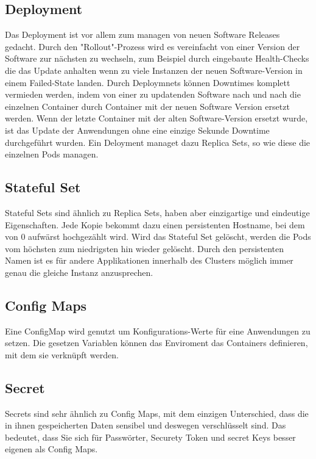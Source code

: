\subsection{Deployment}
Das Deployment ist vor allem zum managen von neuen Software Releases gedacht. 
Durch den "Rollout"-Prozess wird es vereinfacht von einer Version der Software zur nächsten zu wechseln, zum Beispiel durch eingebaute Health-Checks die das Update anhalten wenn zu viele Instanzen der neuen Software-Version in einem Failed-State landen.
Durch Deploymnets können Downtimes komplett vermieden werden, indem von einer zu updatenden Software nach und nach die einzelnen Container durch Container mit der neuen Software Version ersetzt werden.
Wenn der letzte Container mit der alten Software-Version ersetzt wurde, ist das Update der Anwendungen ohne eine einzige Sekunde Downtime durchgeführt wurden.
Ein Deloyment managet dazu Replica Sets, so wie diese die einzelnen Pods managen.
\cite[S.113 ff.]{Kubernetes_up_and_running}

\subsection{Stateful Set}
Stateful Sets sind ähnlich zu Replica Sets, haben aber einzigartige und eindeutige Eigenschaften.
Jede Kopie bekommt dazu einen persistenten Hostname, bei dem von 0 aufwärst hochgezählt wird. 
Wird das Stateful Set gelöscht, werden die Pods vom höchsten zum niedrigsten hin wieder gelöscht.
Durch den persistenten Namen ist es für andere Applikationen innerhalb des Clusters möglich immer genau die gleiche Instanz anzusprechen.
\cite[S.186 f.]{Kubernetes_up_and_running}

\subsection{Config Maps}
Eine ConfigMap wird genutzt um Konfigurations-Werte für eine Anwendungen zu setzen. 
Die gesetzen Variablen können das Enviroment das Containers definieren, mit dem sie verknüpft werden.
\cite[S.153]{Kubernetes_up_and_running}

\subsection{Secret}
Secrets sind sehr ähnlich zu Config Maps, mit dem einzigen Unterschied, dass die in ihnen gespeicherten Daten sensibel und deswegen verschlüsselt sind.
Das bedeutet, dass Sie sich für Passwörter, Securety Token und secret Keys besser eigenen als Config Maps.
\cite[S.157 f.]{Kubernetes_up_and_running}

